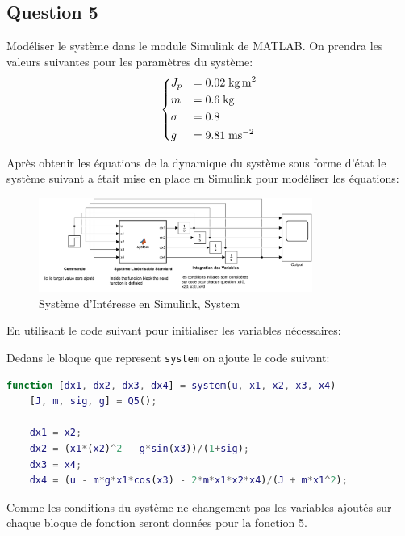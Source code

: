 \documentclass[class=article, crop=false]{standalone}
\begin{document}
\subsection{Question 5}
\begin{exercise}
    Modéliser le système dans le module Simulink de MATLAB. On prendra les valeurs suivantes pour les paramètres du système:
    \begin{equation}
        \begin{dcases}
            J_p &= 0.02 \; \unit{kg.m^{2}}\\
            m &= 0.6 \; \unit{kg}\\
            \sigma &= 0.8\\
            g &= 9.81 \; \unit{ms^{-2}}\\
        \end{dcases}
    \end{equation}
\end{exercise}
\begin{resolution}
    Après obtenir les équations de la dynamique du système sous forme d'état le système suivant a était mise en place en Simulink pour modéliser les équations:
    \begin{figure}[H]
        \centering
        \includegraphics[width = 0.8\textwidth]{../images/system_simulink_2.png}
        \caption{Système d'Intéresse en Simulink, System}
        \label{fig:simulink_system}
    \end{figure}
    En utilisant le code suivant pour initialiser les variables nécessaires:
    \begin{scriptsize}\mycode
        
    \end{scriptsize}
    Dedans le bloque que represent \texttt{system} on ajoute le code suivant:
    \begin{scriptsize}\mycode
    \begin{lstlisting}[language=Matlab]
function [dx1, dx2, dx3, dx4] = system(u, x1, x2, x3, x4)
    [J, m, sig, g] = Q5(); 
    
    dx1 = x2;
    dx2 = (x1*(x2)^2 - g*sin(x3))/(1+sig);
    dx3 = x4;
    dx4 = (u - m*g*x1*cos(x3) - 2*m*x1*x2*x4)/(J + m*x1^2);
        \end{lstlisting}
    \end{scriptsize}
  
    \begin{remark}
        Comme les conditions du système ne changement pas les variables ajoutés sur chaque bloque de fonction seront données pour la fonction 5.
    \end{remark}
\end{resolution}
\end{document}
